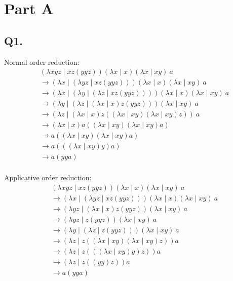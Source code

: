 \documentclass[8pt, letterpaper, titlepage]{article}
\title{\textbf{\Huge{ 
\begin{center}
MATE 201\\ \large{Class notes} %
\end{center} 
}}}
\author{Lora Ma}
\begin{document}
\section*{Part A}

\subsection*{Q1.}
Normal order reduction:
\begin{align}
    &(\lambda xyz \mid xz(yyz)) (\lambda x \mid x) (\lambda x \mid xy)\ a \\
    &\rightarrow (\lambda x \mid(\lambda yz \mid xz(yyz))) (\lambda x \mid x) (\lambda x \mid xy)\ a \\
    &\rightarrow (\lambda x \mid (\lambda y \mid(\lambda z \mid xz(yyz)))) (\lambda x \mid x) (\lambda x \mid xy)\ a \\
    &\rightarrow (\lambda y \mid(\lambda z \mid (\lambda x \mid x)z(yyz))) (\lambda x \mid xy)\ a \\
    &\rightarrow (\lambda z \mid (\lambda x \mid x)z((\lambda x \mid xy)(\lambda x \mid xy)z))\ a \\
    &\rightarrow (\lambda x \mid x)a((\lambda x \mid xy)(\lambda x \mid xy)a) \\
    &\rightarrow a((\lambda x \mid xy)(\lambda x \mid xy)a) \\
    &\rightarrow a(((\lambda x \mid xy)y)a) \\
    &\rightarrow a(yya) \\
\end{align}

Applicative order reduction:
\begin{align}
    &(\lambda xyz \mid xz(yyz)) (\lambda x \mid x) (\lambda x \mid xy)\ a \\
    &\rightarrow (\lambda x \mid (\lambda yz \mid xz(yyz))) (\lambda x \mid x) (\lambda x \mid xy)\ a \\
    &\rightarrow  (\lambda yz \mid (\lambda x \mid x)z(yyz)) (\lambda x \mid xy)\ a \\
    &\rightarrow (\lambda yz \mid z(yyz)) (\lambda x \mid xy)\ a \\
    &\rightarrow (\lambda y \mid (\lambda z \mid z(yyz))) (\lambda x \mid xy)\ a \\
    &\rightarrow (\lambda z \mid z((\lambda x \mid xy)(\lambda x \mid xy)z)) a \\
    &\rightarrow (\lambda z \mid z(((\lambda x \mid xy)y)z)) a \\
    &\rightarrow (\lambda z \mid z((yy)z)) a \\
    &\rightarrow a(yya) \\
\end{align}
\end{document}
